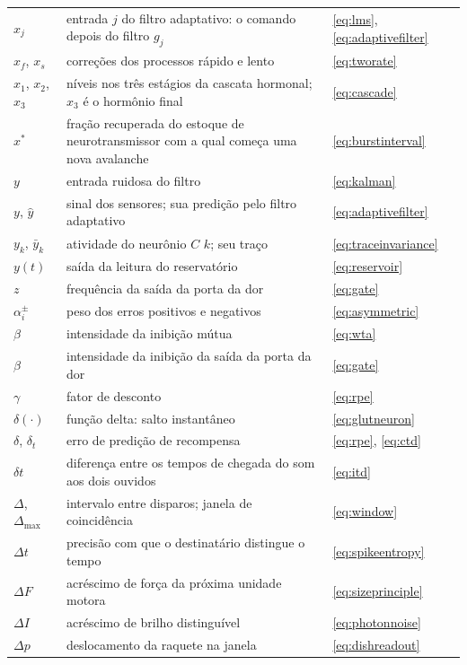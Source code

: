 \begin{center}
\begin{longtable}{>{\raggedright}p{2.0cm}>{\raggedright}p{9.6cm}>{\raggedright\arraybackslash}p{2.4cm}}
$x_j$ & entrada $j$ do filtro adaptativo: o comando depois do filtro $g_j$ & \eqref{eq:lms}, \eqref{eq:adaptivefilter} \\
$x_f$, $x_s$ & correções dos processos rápido e lento & \eqref{eq:tworate} \\
$x_1$, $x_2$, $x_3$ & níveis nos três estágios da cascata hormonal; $x_3$ é o hormônio final & \eqref{eq:cascade} \\
$x^*$ & fração recuperada do estoque de neurotransmissor com a qual começa uma nova avalanche & \eqref{eq:burstinterval} \\
$y$ & entrada ruidosa do filtro & \eqref{eq:kalman} \\
$y$, $\hat y$ & sinal dos sensores; sua predição pelo filtro adaptativo & \eqref{eq:adaptivefilter} \\
$y_k$, $\bar y_k$ & atividade do neurônio $C$ $k$; seu traço & \eqref{eq:traceinvariance} \\
$y(t)$ & saída da leitura do reservatório & \eqref{eq:reservoir} \\
$z$ & frequência da saída da porta da dor & \eqref{eq:gate} \\
\midrule
$\alpha_i^\pm$ & peso dos erros positivos e negativos & \eqref{eq:asymmetric} \\
$\beta$ & intensidade da inibição mútua & \eqref{eq:wta} \\
$\beta$ & intensidade da inibição da saída da porta da dor & \eqref{eq:gate} \\
$\gamma$ & fator de desconto & \eqref{eq:rpe} \\
$\delta(\cdot)$ & função delta: salto instantâneo & \eqref{eq:glutneuron} \\
$\delta$, $\delta_t$ & erro de predição de recompensa & \eqref{eq:rpe}, \eqref{eq:ctd} \\
$\delta t$ & diferença entre os tempos de chegada do som aos dois ouvidos & \eqref{eq:itd} \\
$\Delta$, $\Delta_{\max}$ & intervalo entre disparos; janela de coincidência & \eqref{eq:window} \\
$\Delta t$ & precisão com que o destinatário distingue o tempo & \eqref{eq:spikeentropy} \\
$\Delta F$ & acréscimo de força da próxima unidade motora & \eqref{eq:sizeprinciple} \\
$\Delta I$ & acréscimo de brilho distinguível & \eqref{eq:photonnoise} \\
$\Delta p$ & deslocamento da raquete na janela & \eqref{eq:dishreadout} \\

\end{longtable}
\end{center}

